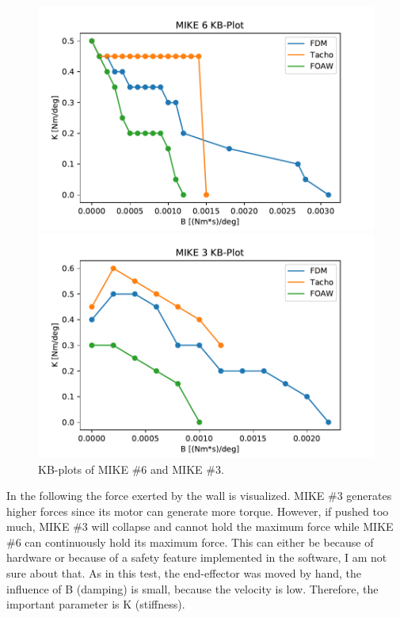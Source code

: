 \begin{figure}[h]
    \begin{minipage}[m]{0.5\textwidth}
     \centering
        \includegraphics[width = \textwidth]{chapters/kb_plot/Mike6_KB_Plot.pdf}
    \end{minipage}
    \hfill
    \begin{minipage}[m]{0.5\textwidth}
     \centering
        \includegraphics[width = \textwidth]{chapters/kb_plot/Mike3_KB_Plot.pdf}
    \end{minipage}
    \caption{KB-plots of MIKE \#6 and MIKE \#3.}
\end{figure}

\clearpage
In the following the force exerted by the wall is visualized. MIKE \#3 generates higher forces since its motor can generate more torque. However, if pushed too much, MIKE \#3 will collapse and cannot hold the maximum force while MIKE \#6 can continuously hold its maximum force. This can either be because of hardware or because of a safety feature implemented in the software, I am not sure about that. As in this test, the end-effector was moved by hand, the influence of B (damping) is small, because the velocity is low. Therefore, the important parameter is K (stiffness). 

